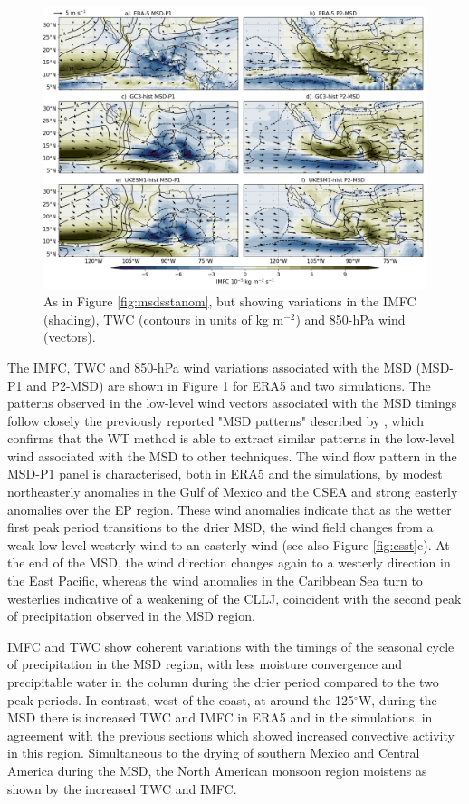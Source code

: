 \begin{figure}[t!]
\includegraphics[width=\linewidth]{figures/imfdcomposite.png}
\caption[Composites of IMFC, TWC and CLLJ]{As in Figure \ref{fig:msdsstanom}, but showing variations in the IMFC (shading), TWC (contours in units of kg m$^{-2}$) and 850-hPa wind (vectors). }
\label{fig:msdmfcanom}
\end{figure}

The IMFC, TWC and 850-hPa wind variations associated with the MSD (MSD-P1 and P2-MSD) are shown in Figure \ref{fig:msdmfcanom} for ERA5 and two simulations. The patterns observed in the low-level wind vectors associated with the MSD timings follow closely the previously reported "MSD patterns" described by \cite{zermeno2019}, which confirms that the WT method is able to extract similar patterns in the low-level wind associated with the MSD to other techniques. 
The wind flow pattern in the MSD-P1 panel is characterised, both  in ERA5 and the simulations, by modest northeasterly anomalies in the Gulf of Mexico and the CSEA and strong easterly anomalies over the EP region. These wind anomalies indicate that as the wetter first peak period transitions to the drier MSD, the wind field changes from a weak low-level westerly wind to an easterly wind (see also Figure \ref{fig:csst}c). 
At the end of the MSD, the wind direction changes again to a westerly direction in the East Pacific, whereas the wind anomalies in the Caribbean Sea turn to westerlies indicative of a weakening of the CLLJ, coincident with the second peak of precipitation observed in the MSD region.

IMFC and TWC show coherent variations with the timings of the seasonal cycle of precipitation in the MSD region, with less moisture convergence and precipitable water in the column during the drier period compared to the two peak periods. 
 In contrast, west of the coast, at around the 125$^\circ$W, during the MSD there is increased TWC and IMFC in ERA5 and in the simulations, in agreement with the previous sections which showed increased convective activity in this region. Simultaneous to the drying of southern Mexico and Central America during the MSD, the North American monsoon region moistens as shown by the increased TWC and IMFC. 

